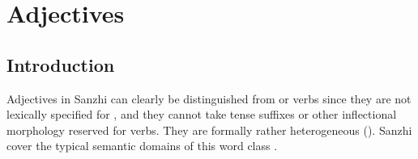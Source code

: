 \chapter{Adjectives}
\label{cpt:morph-adjectives}
\section{Introduction}
\label{sec:Other syntactic properties}

Adjectives in Sanzhi can clearly be distinguished from  or verbs since they are not lexically specified for , and they cannot take tense suffixes or other inflectional morphology reserved for verbs. They are formally rather heterogeneous ().  
Sanzhi  cover the typical semantic domains of this word class .\largerpage

